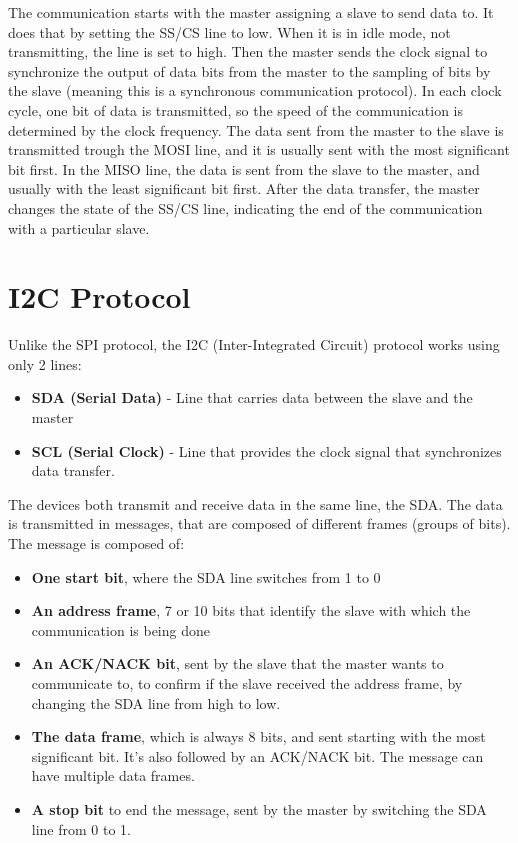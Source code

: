 \documentclass[portuguese]{ist-thesis}
\begin{document}
The communication starts with the master assigning a slave to send data to. It does that by setting the SS/CS line to low. When it is  in idle mode, not transmitting, the line is set to high. Then the master sends the clock signal to synchronize the output of data bits from the master to the sampling of bits by the slave (meaning this is a synchronous communication protocol). In each clock cycle, one bit of data is transmitted, so the speed of the communication is determined by the clock frequency. The data sent from the master to the slave is transmitted trough the MOSI line, and it is usually sent with the most significant bit first. In the MISO line, the data is sent from the slave to the master, and usually with the least significant bit first. After the data transfer, the master changes the state of the SS/CS line, indicating the end of the communication with a particular slave. 

\section{I2C Protocol}

Unlike the SPI protocol, the I2C (Inter-Integrated Circuit) protocol works using only 2 lines:

\begin{itemize}
  \item \textbf{SDA (Serial Data)} - Line that carries data between the slave and the master
  \item \textbf{SCL (Serial Clock)} - Line that provides the clock signal that synchronizes data transfer.
\end{itemize}

The devices both transmit and receive data in the same line, the SDA. The data is transmitted in messages, that are composed of different frames (groups of bits). The message is composed of:

\begin{itemize}
  \item \textbf{One start bit}, where the SDA line switches from 1 to 0
  \item \textbf{An address frame}, 7 or 10 bits that identify the slave with which the communication is being done
  \item \textbf{An ACK/NACK bit}, sent by the slave that the master wants to communicate to, to confirm if the slave received the address frame, by changing the SDA line from high to low.
  \item \textbf{The data frame}, which is always 8 bits, and sent starting with the most significant bit. It's also followed by an ACK/NACK bit. The message can have multiple data frames.
  \item \textbf{A stop bit} to end the message, sent by the master by switching the SDA line from 0 to 1.
\end{itemize}
\end{document}
